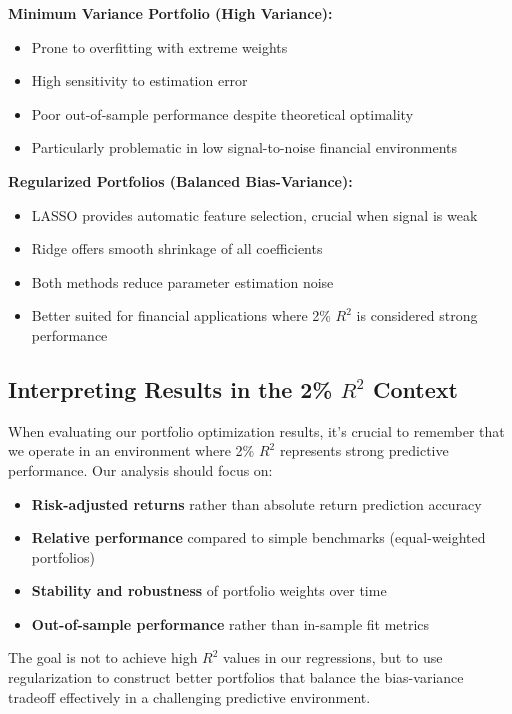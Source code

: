 \documentclass[12pt]{article}
\begin{document}
\textbf{Minimum Variance Portfolio (High Variance):}
\begin{itemize}
    \item Prone to overfitting with extreme weights
    \item High sensitivity to estimation error
    \item Poor out-of-sample performance despite theoretical optimality
    \item Particularly problematic in low signal-to-noise financial environments
\end{itemize}

\textbf{Regularized Portfolios (Balanced Bias-Variance):}
\begin{itemize}
    \item LASSO provides automatic feature selection, crucial when signal is weak
    \item Ridge offers smooth shrinkage of all coefficients
    \item Both methods reduce parameter estimation noise
    \item Better suited for financial applications where 2\% $R^2$ is considered strong performance
\end{itemize}

\subsection{Interpreting Results in the \texorpdfstring{2\% $R^2$}{2\% R-squared} Context}
When evaluating our portfolio optimization results, it's crucial to remember that we operate in an environment where 2\% $R^2$ represents strong predictive performance. Our analysis should focus on:

\begin{itemize}
    \item \textbf{Risk-adjusted returns} rather than absolute return prediction accuracy
    \item \textbf{Relative performance} compared to simple benchmarks (equal-weighted portfolios)
    \item \textbf{Stability and robustness} of portfolio weights over time
    \item \textbf{Out-of-sample performance} rather than in-sample fit metrics
\end{itemize}

The goal is not to achieve high $R^2$ values in our regressions, but to use regularization to construct better portfolios that balance the bias-variance tradeoff effectively in a challenging predictive environment.
\end{document}
